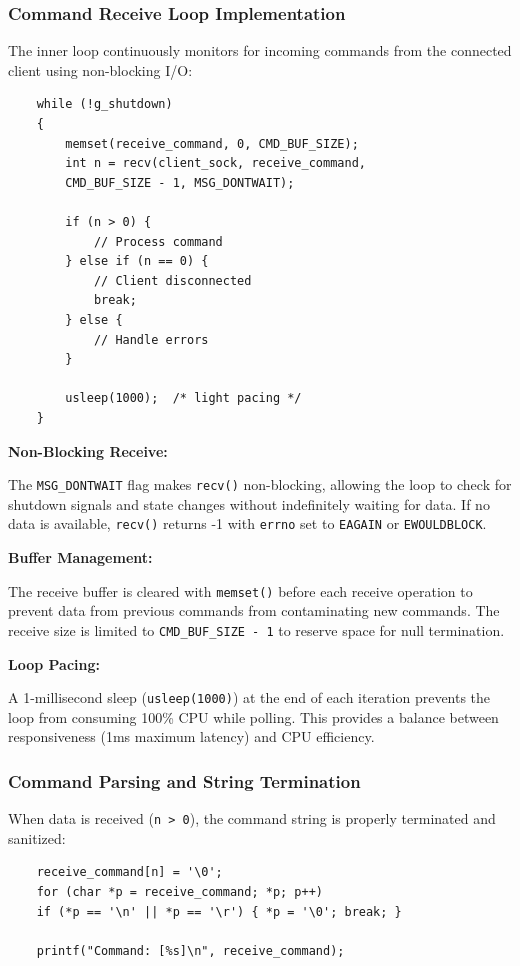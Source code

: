 \subsubsection{Command Receive Loop Implementation}

The inner loop continuously monitors for incoming commands from the connected client using non-blocking I/O:

\begin{verbatim}
	while (!g_shutdown)
	{
		memset(receive_command, 0, CMD_BUF_SIZE);
		int n = recv(client_sock, receive_command, 
		CMD_BUF_SIZE - 1, MSG_DONTWAIT);
		
		if (n > 0) {
			// Process command
		} else if (n == 0) {
			// Client disconnected
			break;
		} else {
			// Handle errors
		}
		
		usleep(1000);  /* light pacing */
	}
\end{verbatim}

\textbf{Non-Blocking Receive:}

The \texttt{MSG\_DONTWAIT} flag makes \texttt{recv()} non-blocking, allowing the loop to check for shutdown signals and state changes without indefinitely waiting for data. If no data is available, \texttt{recv()} returns -1 with \texttt{errno} set to \texttt{EAGAIN} or \texttt{EWOULDBLOCK}.

\textbf{Buffer Management:}

The receive buffer is cleared with \texttt{memset()} before each receive operation to prevent data from previous commands from contaminating new commands. The receive size is limited to \texttt{CMD\_BUF\_SIZE - 1} to reserve space for null termination.

\textbf{Loop Pacing:}

A 1-millisecond sleep (\texttt{usleep(1000)}) at the end of each iteration prevents the loop from consuming 100\% CPU while polling. This provides a balance between responsiveness (1ms maximum latency) and CPU efficiency.

\subsubsection{Command Parsing and String Termination}

When data is received (\texttt{n > 0}), the command string is properly terminated and sanitized:

\begin{verbatim}
	receive_command[n] = '\0';
	for (char *p = receive_command; *p; p++)
	if (*p == '\n' || *p == '\r') { *p = '\0'; break; }
	
	printf("Command: [%s]\n", receive_command);
\end{verbatim}


